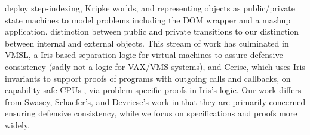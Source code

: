 




 
\citet{dd} deploy
step-indexing, Kripke worlds, and representing objects
as public/private state machines %
to model 
problems including the 
DOM wrapper and a mashup application.
 distinction
between public and private transitions %
 to our
distinction between internal and external objects.
%
%
This stream of work has culminated in VMSL, a Iris-based separation logic for
virtual machines to assure defensive consistency
\cite{vmsl-pldi2023}
(sadly not a logic for VAX/VMS systems),
%
%
and Cerise, which
uses Iris invariants to support proofs of programs
with outgoing calls and callbacks,
on capability-safe CPUs \cite{cerise-jacm2024},
via
problem-specific proofs in Iris's logic.
%
Our work differs from Swasey, Schaefer's, and Devriese's work in that
they are primarily concerned  %
ensuring defensive consistency, 
while we focus on specifications
and proofs more widely.
%
%
%
%


